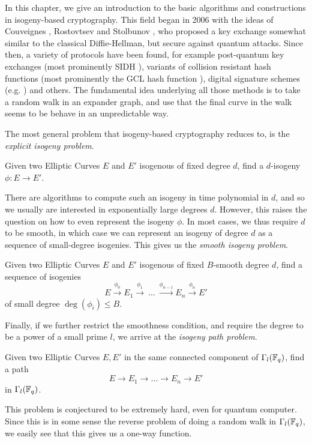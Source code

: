In this chapter, we give an introduction to the basic algorithms and constructions in isogeny-based cryptography.
This field began in 2006 with the ideas of Couveignes \cite{old_isogeny_crypto1}, Rostovtsev and Stolbunov \cite{old_isogeny_crypto2, old_isogeny_crypto3}, who proposed a key exchange somewhat similar to the classical Diffie-Hellman, but secure against quantum attacks.
Since then, a variety of protocols have been found, for example post-quantum key exchanges (most prominently SIDH \cite{sidh}), variants of collision resistant hash functions (most prominently the GCL hash function \cite{supersingular_hash_function}), digital signature schemes (e.g. \cite{digital_signature}) and others. 
The fundamental idea underlying all those methods is to take a random walk in an expander graph, and use that the final curve in the walk seems to be behave in an unpredictable way.

The most general problem that isogeny-based cryptography reduces to, is the \emph{explicit isogeny problem}.
\begin{problem}
    Given two Elliptic Curves $E$ and $E'$ isogenous of fixed degree $d$, find a $d$-isogeny $\phi: E \to E'$.
\end{problem}
There are algorithms to compute such an isogeny in time polynomial in $d$, and so we usually are interested in exponentially large degrees $d$.
However, this raises the question on how to even represent the isogeny $\phi$.
In most cases, we thus require $d$ to be smooth, in which case we can represent an isogeny of degree $d$ as a sequence of small-degree isogenies.
This gives us the \emph{smooth isogeny problem}.
\begin{problem}
    Given two Elliptic Curves $E$ and $E'$ isogenous of fixed $B$-smooth degree $d$, find a sequence of isogenies
    \begin{equation*}
        E \overset{\phi_0}{\longrightarrow} E_1 \overset{\phi_1}{\longrightarrow} \ ... \ \overset{\phi_{n - 1}}{\longrightarrow} E_n \overset{\phi_n}{\longrightarrow} E'
    \end{equation*}
    of small degree $\deg(\phi_i) \leq B$.
\end{problem}
Finally, if we further restrict the smoothness condition, and require the degree to be a power of a small prime $l$, we arrive at the \emph{isogeny path problem}.
\begin{problem}
    Given two Elliptic Curves $E, E'$ in the same connected component of $\Gamma_l(\mathbb{F}_q)$, find a path
    \begin{equation*}
        E \to E_1 \to ... \to E_n \to E'
    \end{equation*}
    in $\Gamma_l(\mathbb{F}_q)$.
\end{problem}
This problem is conjectured to be extremely hard, even for quantum computer.
Since this is in some sense the reverse problem of doing a random walk in $\Gamma_l(\mathbb{F}_q)$, we easily see that this gives us a one-way function.

